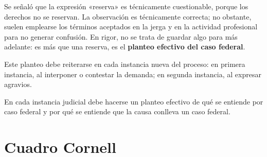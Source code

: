 \documentclass[12pt,oneside]{book}
\begin{document}
\begin{note}
Se señaló que la expresión «reserva» es técnicamente cuestionable, porque los derechos no se reservan. La observación es técnicamente correcta; no obstante, suelen emplearse los términos aceptados en la jerga y en la actividad profesional para no generar confusión. En rigor, no se trata de guardar algo para más adelante: es más que una reserva, es el \textbf{planteo efectivo del caso federal}.
\end{note}

Este planteo debe reiterarse en cada instancia nueva del proceso: en primera instancia, al interponer o contestar la demanda; en segunda instancia, al expresar agravios.

\begin{important}
En cada instancia judicial debe hacerse un planteo efectivo de qué se entiende por caso federal y por qué se entiende que la causa conlleva un caso federal.
\end{important}

\clearpage
\section{Cuadro Cornell}
\end{document}
